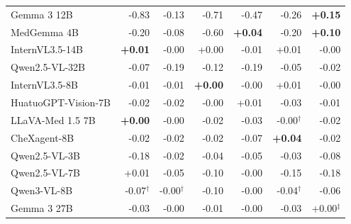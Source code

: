 \documentclass{article}
\begin{document}
\begin{table}[htbp]
\begin{tabular}{lrrrrrr}
Gemma 3 12B & \cellcolor{cfSlate4}-0.83 & \cellcolor{cfSlate3}-0.13 & \cellcolor{cfSlate4}-0.71 & \cellcolor{cfSlate4}-0.47 & \cellcolor{cfSlate4}-0.26 & \cellcolor{cfTerra3}\textbf{+0.15} \\
MedGemma 4B & \cellcolor{cfSlate3}-0.20 & \cellcolor{cfSlate2}-0.08 & \cellcolor{cfSlate4}-0.60 & \cellcolor{cfTerra2}\textbf{+0.04} & \cellcolor{cfSlate3}-0.20 & \cellcolor{cfTerra3}\textbf{+0.10} \\
InternVL3.5-14B & \cellcolor{cfTerra1}\textbf{+0.01} & \cellcolor{cfSlate1}-0.00 & \cellcolor{cfTerra1}+0.00 & \cellcolor{cfSlate1}-0.01 & \cellcolor{cfTerra1}+0.01 & \cellcolor{cfSlate1}-0.00 \\
Qwen2.5-VL-32B & \cellcolor{cfSlate2}-0.07 & \cellcolor{cfSlate3}-0.19 & \cellcolor{cfSlate3}-0.12 & \cellcolor{cfSlate3}-0.19 & \cellcolor{cfSlate2}-0.05 & \cellcolor{cfSlate2}-0.02 \\
InternVL3.5-8B & \cellcolor{cfSlate1}-0.01 & \cellcolor{cfSlate1}-0.01 & \cellcolor{cfTerra1}\textbf{+0.00} & \cellcolor{cfSlate1}-0.00 & \cellcolor{cfTerra1}+0.01 & \cellcolor{cfSlate1}-0.00 \\
HuatuoGPT-Vision-7B & \cellcolor{cfSlate2}-0.02 & \cellcolor{cfSlate1}-0.02 & \cellcolor{cfSlate1}-0.00 & \cellcolor{cfTerra1}+0.01 & \cellcolor{cfSlate2}-0.03 & \cellcolor{cfSlate1}-0.01 \\
LLaVA-Med 1.5 7B & \cellcolor{cfTerra1}\textbf{+0.00} & \cellcolor{cfSlate1}-0.00 & \cellcolor{cfSlate2}-0.02 & \cellcolor{cfSlate2}-0.03 & \cellcolor{cfSlate1}-0.00$^{\dagger}$ & \cellcolor{cfSlate1}-0.02 \\
CheXagent-8B & \cellcolor{cfSlate2}-0.02 & \cellcolor{cfSlate1}-0.02 & \cellcolor{cfSlate2}-0.02 & \cellcolor{cfSlate2}-0.07 & \cellcolor{cfTerra2}\textbf{+0.04} & \cellcolor{cfSlate2}-0.02 \\
Qwen2.5-VL-3B & \cellcolor{cfSlate3}-0.18 & \cellcolor{cfSlate1}-0.02 & \cellcolor{cfSlate2}-0.04 & \cellcolor{cfSlate2}-0.05 & \cellcolor{cfSlate2}-0.03 & \cellcolor{cfSlate2}-0.08 \\
Qwen2.5-VL-7B & \cellcolor{cfTerra1}+0.01 & \cellcolor{cfSlate2}-0.05 & \cellcolor{cfSlate2}-0.10 & \cellcolor{cfSlate1}-0.00 & \cellcolor{cfSlate3}-0.15 & \cellcolor{cfSlate3}-0.18 \\
Qwen3-VL-8B & \cellcolor{cfSlate2}-0.07$^{\dagger}$ & \cellcolor{cfSlate1}-0.00$^{\dagger}$ & \cellcolor{cfSlate2}-0.10 & \cellcolor{cfSlate1}-0.00 & \cellcolor{cfSlate2}-0.04$^{\dagger}$ & \cellcolor{cfSlate2}-0.06 \\
Gemma 3 27B & \cellcolor{cfSlate2}-0.03 & \cellcolor{cfSlate1}-0.00 & \cellcolor{cfSlate1}-0.01 & \cellcolor{cfSlate1}-0.00 & \cellcolor{cfSlate2}-0.03 & \cellcolor{cfTerra1}+0.00$^{\ddagger}$ \\

\end{tabular}
\end{table}
\end{document}
